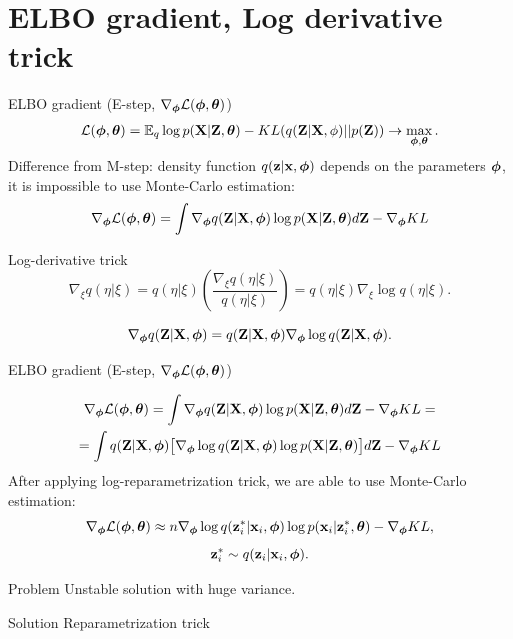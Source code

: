 \section{ELBO gradient, Log derivative trick}
\begin{frame}{ELBO gradient (E-step, $\nabla_{\boldsymbol{\phi}} \mathcal{L}(\boldsymbol{\phi}, \boldsymbol{\theta})$)}
\vspace{-0.3cm}
\[
	\mathcal{L} (\boldsymbol{\phi}, \boldsymbol{\theta})  = \mathbb{E}_{q} \log p(\mathbf{X} | \mathbf{Z}, \boldsymbol{\theta}) - KL (q(\mathbf{Z}| \mathbf{X}, \phi) || p(\mathbf{Z})) \rightarrow \max_{\boldsymbol{\phi}, \boldsymbol{\theta}}.
\]
	Difference from M-step: density function $q(\mathbf{z}| \mathbf{x}, \boldsymbol{\phi})$ depends on the parameters $\boldsymbol{\phi}$, it is impossible to use Monte-Carlo estimation:
	\[
		\nabla_{\boldsymbol{\phi}} \mathcal{L} (\boldsymbol{\phi}, \boldsymbol{\theta}) = \int \nabla_{\boldsymbol{\phi}} q(\mathbf{Z}| \mathbf{X}, \boldsymbol{\phi}) \log p(\mathbf{X} |\mathbf{Z}, \boldsymbol{\theta}) d\mathbf{Z} - \nabla_{\boldsymbol{\phi}} KL
	\]
	
	\begin{block}{Log-derivative trick}
	    \[
	    \nabla_\xi q(\eta| \xi) = q(\eta | \xi) \left( \frac{\nabla_\xi q(\eta | \xi)}{q(\eta| \xi)} \right) = q(\eta | \xi) \nabla_\xi \log q(\eta| \xi).
	    \]
	\end{block}
	\[
		\nabla_{\boldsymbol{\phi}} q(\mathbf{Z}| \mathbf{X}, \boldsymbol{\phi}) = q(\mathbf{Z}| \mathbf{X}, \boldsymbol{\phi}) \nabla_{\boldsymbol{\phi}} \log q(\mathbf{Z}| \mathbf{X}, \boldsymbol{\phi}).
	\]
\end{frame}
\begin{frame}{ELBO gradient (E-step, $\nabla_{\boldsymbol{\phi}} \mathcal{L}(\boldsymbol{\phi}, \boldsymbol{\theta})$)}

	\begin{multline*}
		\nabla_{\boldsymbol{\phi}} \mathcal{L} (\boldsymbol{\phi}, \boldsymbol{\theta}) = \int \nabla_{\boldsymbol{\phi}} q(\mathbf{Z}| \mathbf{X}, \boldsymbol{\phi}) \log p(\mathbf{X} |\mathbf{Z}, \boldsymbol{\theta}) d\mathbf{Z}  - \nabla_{\boldsymbol{\phi}} KL = \\ 
		=  \int q(\mathbf{Z}| \mathbf{X}, \boldsymbol{\phi}) \bigl[  \nabla_{\boldsymbol{\phi}} \log q(\mathbf{Z}| \mathbf{X}, \boldsymbol{\phi}) \log p(\mathbf{X} |\mathbf{Z}, \boldsymbol{\theta}) \bigr] d\mathbf{Z} - \nabla_{\boldsymbol{\phi}} KL
	\end{multline*}
	After applying log-reparametrization trick, we are able to use Monte-Carlo estimation:
	\[
		\nabla_{\boldsymbol{\phi}} \mathcal{L} (\boldsymbol{\phi}, \boldsymbol{\theta}) \approx n \nabla_{\boldsymbol{\phi}} \log q(\mathbf{z}_i^*| \mathbf{x}_i, \boldsymbol{\phi}) \log p(\mathbf{x}_i |\mathbf{z}_i^*, \boldsymbol{\theta}) - \nabla_{\boldsymbol{\phi}} KL,
	\]
	\[
		\mathbf{z}_i^* \sim q(\mathbf{z}_i| \mathbf{x}_i, \boldsymbol{\phi}).
	\]
	\vspace{-0.2cm}
	\begin{block}{Problem} 
	Unstable solution with huge variance.
	\end{block}
	\begin{block}{Solution}
	    Reparametrization trick
	\end{block}
\end{frame}
